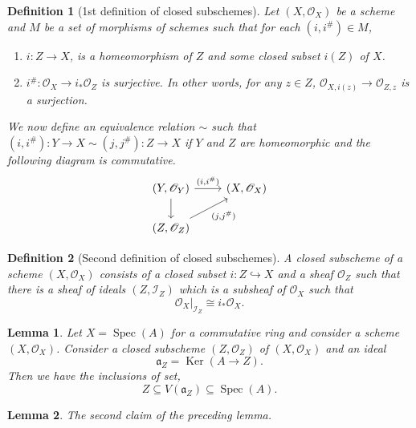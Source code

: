 \documentclass{article}
\newtheorem{definition}{Definition}[section]
\newtheorem{lemma}{Lemma}[section]
\numberwithin{equation}{section}
\DeclareMathOperator{\Spec}{Spec}
\DeclareMathOperator{\Ker}{Ker}
\begin{document}
\begin{definition}[1st definition of closed subschemes]
Let $(X,\mathcal{O}_X)$ be a scheme and $M$ be a set of morphisms of schemes such that for each $(i,i^{\#})\in M$, 
\begin{enumerate}
\item $i:Z\to X$, is a homeomorphism of $Z$ and some closed subset $i(Z)$ of $X$.
\item $i^{\#}:\mathcal{O}_X\to i_*\mathcal{O}_Z$ is surjective. In other words, for any $z\in Z$, $\mathcal{O}_{X,i(z)}\to\mathcal{O}_{Z,z}$ is a surjection. 
\end{enumerate}
We now define an equivalence relation $\sim$ such that $(i,i^{\#}):Y\to X\sim(j,j^{\#}):Z\to X$ if $Y$ and $Z$ are homeomorphic and the following diagram is commutative.
\[
\begin{tikzcd}
(Y,\mathcal{O}_Y) \arrow{r}{(i,i^{\#})} \arrow{d} & (X,\mathcal{O}_X)\\
(Z,\mathcal{O}_Z)\arrow{ur}[swap]{(j,j^{\#})} 
\end{tikzcd}
\]
\end{definition}

\begin{definition}[Second definition of closed subschemes]
A closed subscheme of a scheme $(X,\mathcal{O}_X)$ consists of a closed subset $i:Z\hookrightarrow X$ and a sheaf $\mathcal{O}_Z$ such that there is a sheaf of ideals $(Z,\mathcal{I}_Z)$ which is a subsheaf of $\mathcal{O}_X$ such that 
\begin{equation*}
\mathcal{O}_X|_{\mathcal{I}_Z}\cong i_*\mathcal{O}_X.
\end{equation*}
\end{definition}

\begin{lemma}
Let $X=\Spec(A)$ for a commutative ring and consider a scheme $(X,\mathcal{O}_X)$. Consider a closed subscheme $(Z,\mathcal{O}_Z)$ of $(X,\mathcal{O}_X)$ and an ideal
\begin{equation*}
\mathfrak{a}_Z = \Ker(A\to Z).
\end{equation*}
Then we have the inclusions of set, 
\begin{equation*}
Z\subseteq V(\mathfrak{a}_Z)\subseteq \Spec (A).
\end{equation*}
\end{lemma}

\begin{lemma}
The second claim of the preceding lemma.
\end{lemma}
\end{document}
